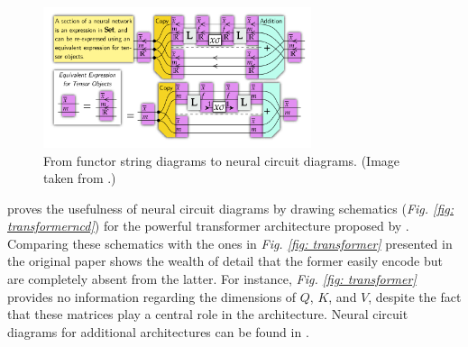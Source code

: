 \documentclass[11pt,a4paper,openright,twoside]{report}
\theoremstyle{plain}
\theoremstyle{definition}
\begin{document}
\begin{figure}[h]
  \begin{center}
    \includegraphics[width=0.7\textwidth]{figures/from_fsd_to_ncd.png}     
    \caption[From functor string diagrams to neural circuit diagrams]{From functor string diagrams to neural circuit diagrams. (Image taken from \cite{abbott2024functor}.)}
    \label{fig: fromfsdtoncd}
  \end{center}
\end{figure}

\cite{abbott2024neural} proves the usefulness of neural circuit diagrams by drawing schematics (\textit{Fig. \ref{fig: transformerncd}}) for the powerful transformer architecture proposed by \cite{vaswani2017attention}. Comparing these schematics with the ones in \textit{Fig. \ref{fig: transformer}} presented in the original paper shows the wealth of detail that the former easily encode but are completely absent from the latter. For instance, \textit{Fig. \ref{fig: transformer}} provides no information regarding the dimensions of $Q$, $K$, and $V$, despite the fact that these matrices play a central role in the architecture.  Neural circuit diagrams for additional architectures can be found in \cite{abbott2024neural}.
\end{document}
